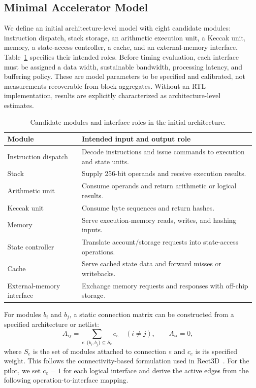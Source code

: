 \documentclass[runningheads]{llncs}
\begin{document}
\subsection{Minimal Accelerator Model}
We define an initial architecture-level model with eight candidate modules: instruction dispatch, stack storage, an arithmetic execution unit, a Keccak unit, memory, a state-access controller, a cache, and an external-memory interface. Table~\ref{tab:modules} specifies their intended roles. Before timing evaluation, each interface must be assigned a data width, sustainable bandwidth, processing latency, and buffering policy. These are model parameters to be specified and calibrated, not measurements recoverable from block aggregates. Without an RTL implementation, results are explicitly characterized as architecture-level estimates.
\begin{table}[t]
\caption{Candidate modules and interface roles in the initial architecture.}\label{tab:modules}
\small\centering
\begin{tabularx}{\textwidth}{@{}lX@{}}
\toprule Module & Intended input and output role \\\midrule
Instruction dispatch & Decode instructions and issue commands to execution and state units.\\
Stack & Supply 256-bit operands and receive execution results.\\
Arithmetic unit & Consume operands and return arithmetic or logical results.\\
Keccak unit & Consume byte sequences and return hashes.\\
Memory & Serve execution-memory reads, writes, and hashing inputs.\\
State controller & Translate account/storage requests into state-access operations.\\
Cache & Serve cached state data and forward misses or writebacks.\\
External-memory interface & Exchange memory requests and responses with off-chip storage.\\
\bottomrule
\end{tabularx}
\end{table}

For modules $b_i$ and $b_j$, a static connection matrix can be constructed from a specified architecture or netlist:
\begin{equation}
A_{ij}=\sum_{e:\{b_i,b_j\}\subseteq S_e}c_e \quad(i\ne j),\qquad A_{ii}=0,
\end{equation}
where $S_e$ is the set of modules attached to connection $e$ and $c_e$ is its specified weight. This follows the connectivity-based formulation used in Rect3D~\cite{rect3d}. For the pilot, we set $c_e=1$ for each logical interface and derive the active edges from the following operation-to-interface mapping.
\end{document}
